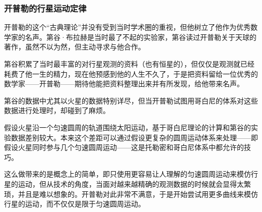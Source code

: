 \subsubsection{开普勒的行星运动定律}

开普勒的这个“古典理论”并没有受到当时学术圈的重视，但他树立了他作为优秀数学家的名声。第谷·布拉赫是当时最了不起的实验家，第谷读过开普勒关于天球的著作，虽然不以为然，但主动寻求与他合作。

第谷积累了当时最丰富的对行星观测的资料（也有恒星的），但仅仅是观测就已经耗费了他一生的精力，现在他预感到他的人生不久了，于是把资料留给一位优秀的数学家——开普勒——期待他能把资料整理出来并有所发现，给他带来名声。

第谷的数据中尤其以火星的数据特别详尽，但当开普勒试图用哥白尼的体系对这些数据进行处理时，却碰到了麻烦。

假设火星沿一个匀速圆周的轨道围绕太阳运动，基于哥白尼理论的计算和第谷的实验数据差别较大。本来这个差距可以通过假设更复杂的圆周运动体系来处理——即假设火星同时参与几个匀速圆周运动——这是托勒密和哥白尼体系中都允许的技巧。

这么做带来的是概念上的简单，即只使用更容易让人理解的匀速圆周运动来模仿行星的运动，但从技术的角度，当面对越来越精确的观测数据的时候就会显得太繁琐，并且是难以想象的。开普勒对此非常不满意，于是开始尝试用更多曲线来模仿行星的运动，而不仅仅是限于匀速圆周运动。

